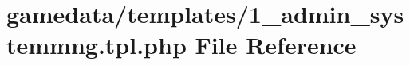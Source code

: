\hypertarget{1__admin__systemmng_8tpl_8php}{\section{gamedata/templates/1\+\_\+admin\+\_\+systemmng.tpl.\+php File Reference}
\label{1__admin__systemmng_8tpl_8php}
}
